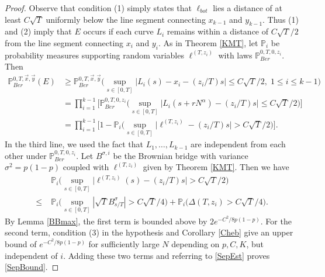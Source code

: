 \begin{proof}
	Observe that condition (1) simply states that $\ell_{bot}$ lies a distance of at least $C\sqrt{T}$ uniformly below the line segment connecting $x_{k-1}$ and $y_{k-1}$. Thus (1) and (2) imply that $E$ occurs if each curve $L_i$ remains within a distance of $C\sqrt{T}/2$ from the line segment connecting $x_i$ and $y_i$. As in Theorem \ref{KMT}, let $\mathbb{P}_i$ be probability measures supporting random variables $\ell^{(T,z_i)}$ with laws $\mathbb{P}^{0,T,0,z_i}_{Ber}$. Then
	\begin{align}
	\mathbb{P}^{0, T,\vec{x},\vec{y}}_{Ber} (E) &\geq \mathbb{P}^{0,T,\vec{x},\vec{y}}_{Ber} \Big(\sup_{s\in[0,T]} \big|L_i(s) - x_i - (z_i/T)s\big| \leq C\sqrt{T}/2, \;1\leq i\leq k-1\Big) \nonumber\\
	&= \prod_{i=1}^{k-1}\Big[ \mathbb{P}^{0,T,0,z_i}_{Ber} \Big(\sup_{s\in[0,T]} \big|L_i(s+rN^\alpha) - (z_i/T)s\big| \leq C\sqrt{T}/2\Big)\Big] \nonumber\\
	&= \prod_{i=1}^{k-1}\Big[ 1 - \mathbb{P}_i\Big(\sup_{s\in[0,T]} \big|\ell^{(T,z_i)} - (z_i/T)s\big| > C\sqrt{T}/2\Big)\Big]. \label{SepEst}
	\end{align}
	In the third line, we used the fact that $L_1,\dots,L_{k-1}$ are independent from each other under $\mathbb{P}^{0,T,0,z_i}_{Ber}$. Let $B^{\sigma,i}$ be the Brownian bridge with variance $\sigma^2 = p(1-p)$ coupled with $\ell^{(T,z_i)}$ given by Theorem \ref{KMT}. Then we have
	\begin{align*}
	&\mathbb{P}_i \Big(\sup_{s\in[0,T]} \big|\ell^{(T,z_i)}(s) - (z_i/T)s\big| > C\sqrt{T}/2\Big)\\
	\leq \; & \mathbb{P}_i\Big(\sup_{s\in[0,T]} |\sqrt{T}B^{\sigma}_{s/T}| > C\sqrt{T}/4\Big) + \mathbb{P}_i\Big(\Delta(T,z_i) > C\sqrt{T}/4\Big).
	\end{align*}
	By Lemma \ref{BBmax}, the first term is bounded above by $2e^{-C^2/8p(1-p)}$. For the second term, condition (3) in the hypothesis and Corollary \ref{Cheb} give an upper bound of $e^{-C^2/8p(1-p)}$ for sufficiently large $N$ depending on $p,C,K$, but independent of $i$. Adding these two terms and referring to \eqref{SepEst} proves \eqref{SepBound}.
\end{proof}


%
